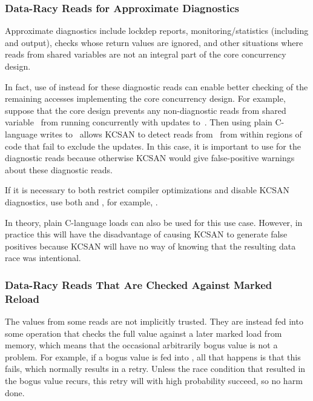 \subsubsection{Data-Racy Reads for Approximate Diagnostics}

Approximate diagnostics include lockdep reports, monitoring/statistics
(including  and  output), 
checks whose return values are ignored, and other situations where reads
from shared variables are not an integral part of the core concurrency design.

In fact, use of  instead  for these diagnostic
reads can enable better checking of the remaining accesses implementing
the core concurrency design.
For example, suppose that the core design prevents any non-diagnostic
reads from shared variable~ from running concurrently with updates
to~.
Then using plain C-language writes to~ allows KCSAN to detect reads
from~ from within regions of code that fail to exclude the updates.
In this case, it is important to use  for the diagnostic
reads because otherwise KCSAN would give false-positive warnings about
these diagnostic reads.

If it is necessary to both restrict compiler optimizations and disable
KCSAN diagnostics, use both  and , for example,
.

In theory, plain C-language loads can also be used for this use case.
However, in practice this will have the disadvantage of causing KCSAN
to generate false positives because KCSAN will have no way of knowing
that the resulting data race was intentional.


\subsubsection{Data-Racy Reads That Are Checked Against Marked Reload}

The values from some reads are not implicitly trusted.
They are instead fed into some operation that checks the full value
against a later marked load from memory, which means that the occasional
arbitrarily bogus value is not a problem.
For example, if a bogus value is fed into , all that happens
is that this  fails, which normally results in a retry.
Unless the race condition that resulted in the bogus value recurs, this
retry will with high probability succeed, so no harm done.

